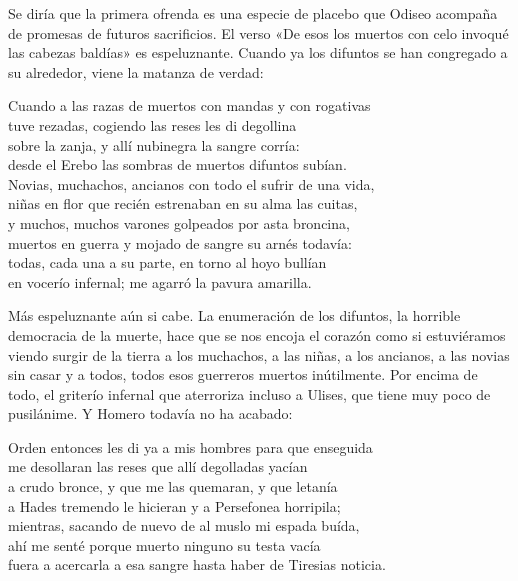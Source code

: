 Se diría que la primera ofrenda es una especie de placebo que Odiseo acompaña de promesas de futuros sacrificios. El verso «De esos los muertos con celo invoqué las cabezas baldías» es espeluznante. Cuando ya los difuntos se han congregado a su alrededor, viene la matanza de verdad:

\begin{versocita}
Cuando a las razas de muertos con mandas y con rogativas\\
tuve rezadas, cogiendo las reses les di degollina\\
sobre la zanja, y allí nubinegra la sangre corría:\\
desde el Erebo las sombras de muertos difuntos subían.\\
Novias, muchachos, ancianos con todo el sufrir de una vida,\\
niñas en flor que recién estrenaban en su alma las cuitas,\\
y muchos, muchos varones golpeados por asta broncina,\\
muertos en guerra y mojado de sangre su arnés todavía:\\
todas, cada una a su parte, en torno al hoyo bullían\\
en vocerío infernal; me agarró la pavura amarilla.
\end{versocita}

Más espeluznante aún si cabe. La enumeración de los difuntos, la horrible democracia de la muerte, hace que se nos encoja el corazón como si estuviéramos viendo surgir de la tierra a los muchachos, a las niñas, a los ancianos, a las novias sin casar y a todos, todos esos guerreros muertos inútilmente. Por encima de todo, el griterío infernal que aterroriza incluso a Ulises, que tiene muy poco de pusilánime. Y Homero todavía no ha acabado:

\begin{versocita}
Orden entonces les di ya a mis hombres para que enseguida\\
me desollaran las reses que allí degolladas yacían\\
a crudo bronce, y que me las quemaran, y que letanía\\
a Hades tremendo le hicieran y a Persefonea horripila;\\
mientras, sacando de nuevo de al muslo mi espada buída,\\
ahí me senté porque muerto ninguno su testa vacía\\
fuera a acercarla a esa sangre hasta haber de Tiresias noticia.
\end{versocita}

